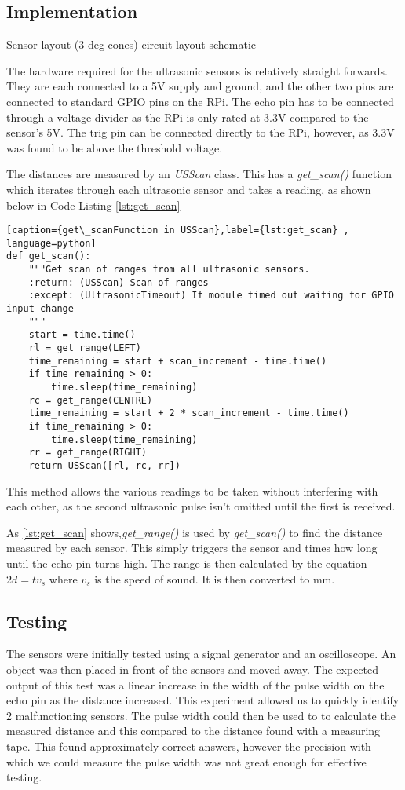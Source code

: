 \subsection{Implementation}\label{elec/range/impl}
Sensor layout (3 deg cones)
circuit layout
schematic

The hardware required for the ultrasonic sensors is relatively straight forwards. They are each connected to a 5V supply and ground, and the other two pins are connected to standard GPIO pins on the RPi. The echo pin has to be connected through a voltage divider as the RPi is only rated at 3.3V compared to the sensor's 5V. The trig pin can be connected directly to the RPi, however, as 3.3V was found to be above the threshold voltage.

The distances are measured by an \textit{USScan} class. This has a \textit{get\_scan()} function which iterates through each ultrasonic sensor and takes a reading, as shown below in Code Listing \ref{lst:get_scan}

\begin{lstlisting}[caption={get\_scanFunction in USScan},label={lst:get_scan} , language=python]
def get_scan():
    """Get scan of ranges from all ultrasonic sensors.
    :return: (USScan) Scan of ranges
    :except: (UltrasonicTimeout) If module timed out waiting for GPIO input change
    """
    start = time.time()
    rl = get_range(LEFT)
    time_remaining = start + scan_increment - time.time()
    if time_remaining > 0:
        time.sleep(time_remaining)
    rc = get_range(CENTRE)
    time_remaining = start + 2 * scan_increment - time.time()
    if time_remaining > 0:
        time.sleep(time_remaining)
    rr = get_range(RIGHT)
    return USScan([rl, rc, rr])
\end{lstlisting}

This method allows the various readings to be taken without interfering with each other, as the second ultrasonic pulse isn't omitted until the first is received.

As \ref{lst:get_scan} shows,\textit{get\_range()} is used by 
\textit{get\_scan()} to find the distance measured by each sensor.
This simply triggers the sensor and times how long until the echo
pin turns high. The range is then calculated by the equation 
$ 2d = tv_s$ where $v_s$ is the speed of sound. It is then converted 
to mm.

\subsection{Testing}\label{elec/range/test}
The sensors were initially tested using a signal generator and an
oscilloscope. An object was then placed in front of the sensors
and moved away. The expected output of this test was a linear increase
in the width of the pulse width on the echo pin as the distance 
increased. This experiment allowed us to quickly identify 2 
malfunctioning sensors. The pulse width could then be used to to 
calculate the measured distance and this compared to the distance 
found with a measuring tape. This found approximately correct answers, 
however the precision with which we could measure the pulse width was
not great enough for effective testing.


